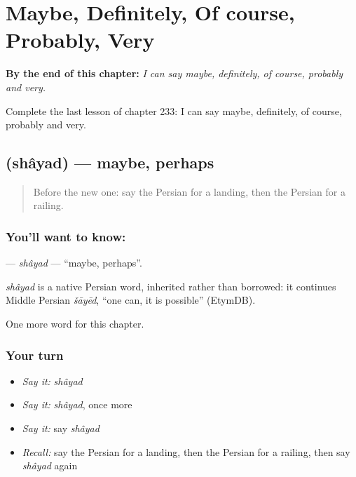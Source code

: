 
\chapter{Maybe, Definitely, Of course, Probably, Very}
\label{ch:fa-maybe-definitely-of-course-probably-very}

\begin{chapteropening}
\textbf{By the end of this chapter:} \emph{I can say maybe, definitely, of course, probably and very.}

Complete the last lesson of chapter 233: I can say maybe, definitely, of course, probably and very.
\end{chapteropening}

\section[\texorpdfstring{\fa{شاید} (shâyad)}{شاید (shâyad)}]{ (shâyad) — maybe, perhaps}

\label{lesson:FA-C233-shayad}



\begin{quote}
Before the new one: say the Persian for a landing, then the Persian for a railing.
\end{quote}

\subsection*{You'll want to know: }
\textbf{} — \emph{shâyad} — \textquotedblleft{}maybe, perhaps\textquotedblright{}.

\begin{cousinweb}
\emph{shâyad} is a native Persian word, inherited rather than borrowed: it continues Middle Persian \emph{šāyēd}, \textquotedblleft{}one can, it is possible\textquotedblright{} (EtymDB).
\end{cousinweb}

\begin{grammarlens}[title={What you've built}]
One more word for this chapter.
\end{grammarlens}

\subsection*{Your turn}
\begin{itemize}
\raggedright
  \item \emph{Say it:} \emph{shâyad}
  \item \emph{Say it:} \emph{shâyad}, once more
  \item \emph{Say it:} say \emph{shâyad}
  \item \emph{Recall:} say the Persian for a landing, then the Persian for a railing, then say \emph{shâyad} again
\end{itemize}

